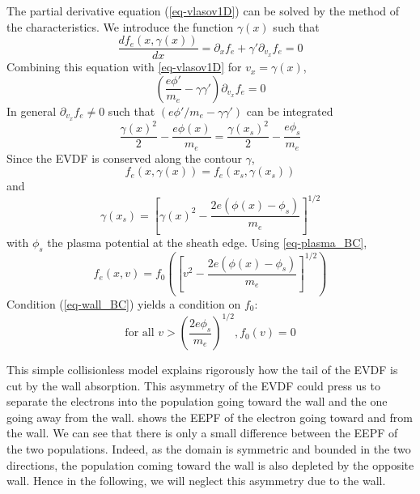     The partial derivative equation (\ref{eq-vlasov1D}) can be solved by the method of the characteristics. We introduce the function $\gamma(x)$ such that
    \begin{equation}
      \frac{df_e(x,\gamma(x))}{dx} = \partial_x f_e + \gamma' \partial_{v_x} f_e = 0
    \end{equation}
    Combining this equation with \cref{eq-vlasov1D} for $v_x = \gamma(x)$,
    \begin{equation}
      \label{eq-char}
      \left( \frac{e\phi'}{m_e} - \gamma \gamma' \right) \partial_{v_x} f_e = 0
    \end{equation}
    In general $\partial_{v_x} f_e \neq 0$ such that $(e\phi'/m_e - \gamma\gamma')$ can be integrated
    \begin{equation}
      \frac{\gamma(x)^2}{2} - \frac{e\phi(x)}{m_e} = \frac{\gamma(x_s)^2}{2} - \frac{e\phi_s}{m_e}
    \end{equation}
    Since the EVDF is conserved along the contour $\gamma$,
    \begin{equation}
      f_e(x,\gamma(x)) = f_e(x_s, \gamma(x_s))
    \end{equation}
    and
    \begin{equation}
      \gamma(x_s) = \left[ \gamma(x)^2 - \frac{2e(\phi(x) - \phi_s)}{m_e} \right]^{1/2}
    \end{equation}
    with $\phi_s$ the plasma potential at the sheath edge.
    Using \cref{eq-plasma_BC},
    \begin{equation}
      \label{eq-sol}
      f_e(x,v) = f_0\left( \left[ v^2 - \frac{2e(\phi(x) - \phi_s)}{m_e} \right]^{1/2}\right)
    \end{equation}
    Condition (\ref{eq-wall_BC}) yields a condition on $f_0$\string:
    \begin{equation}
      \label{eq-trunc}
      \text{for all } v > \left( \frac{2e\phi_s}{m_e} \right)^{1/2}, f_0(v) = 0
    \end{equation}
    
    This simple collisionless model explains rigorously how the tail of the EVDF is cut by the wall absorption.
    This asymmetry of the \ac{EVDF} could press us to separate the electrons into the population going toward the wall and the one going away from the wall.
     shows the EEPF of the electron going toward and from the wall.
    We can see that there is only a small difference between the  EEPF of the two populations.
    Indeed, as the domain is symmetric and bounded in the two directions, the population coming toward the wall is also depleted by the opposite wall.
    Hence in the following, we will neglect this asymmetry due to the wall.


